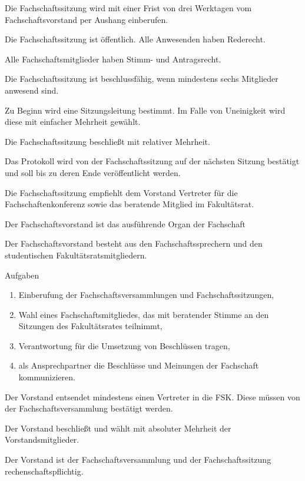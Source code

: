\documentclass[a4paper,parskip=half,numbers=noenddot]{scrartcl}
\begin{document}
\begin{contract}
Die Fachschaftssitzung wird mit einer Frist von drei Werktagen vom Fachschaftsvorstand per Aushang einberufen.

Die Fachschaftssitzung ist öffentlich. Alle Anwesenden haben Rederecht.

Alle Fachschaftsmitglieder haben Stimm- und Antragsrecht.

Die Fachschaftssitzung ist beschlussfähig, wenn mindestens sechs Mitglieder anwesend sind.

Zu Beginn wird eine Sitzungsleitung bestimmt. Im Falle von Uneinigkeit wird diese mit einfacher Mehrheit gewählt.

Die Fachschaftssitzung beschließt mit relativer Mehrheit. 

Das Protokoll wird von der Fachschaftssitzung auf der nächsten Sitzung bestätigt und soll bis zu deren Ende veröffentlicht werden.

Die Fachschaftssitzung empfiehlt dem Vorstand Vertreter für die Fachschaftenkonferenz sowie das beratende Mitglied im Fakultätsrat.


\label{fs:vorstand}

Der Fachschaftsvorstand ist das ausführende Organ der Fachschaft

Der Fachschaftsvorstand besteht aus den Fachschaftssprechern und den studentischen Fakultätsratsmitgliedern.

Aufgaben
\begin{enumerate}
\item Einberufung der Fachschaftsversammlungen und Fachschaftssitzungen,
\item Wahl eines Fachschaftsmitgliedes, das mit beratender Stimme an den Sitzungen des Fakultätsrates teilnimmt,
\item Verantwortung für die Umsetzung von Beschlüssen tragen,
\item als Ansprechpartner die Beschlüsse und Meinungen der Fachschaft kommunizieren.
\end{enumerate}
 
Der Vorstand entsendet mindestens einen Vertreter in die FSK. Diese müssen von der Fachschaftsversammlung bestätigt werden.

Der Vorstand beschließt und wählt mit absoluter Mehrheit der Vorstandsmitglieder.

Der Vorstand ist der Fachschaftsversammlung und der Fachschaftssitzung rechenschaftspflichtig.


%
%


\end{contract}
\end{document}
